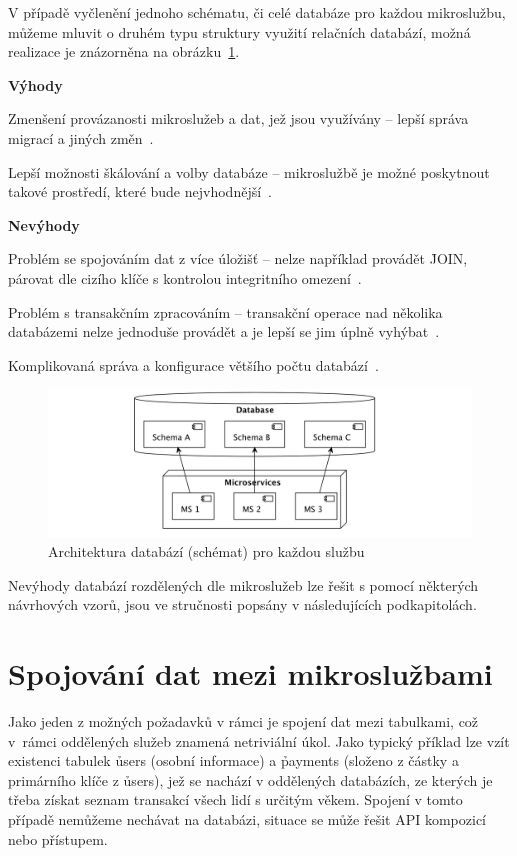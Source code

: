 V případě vyčlenění jednoho schématu, či celé databáze pro každou mikroslužbu, můžeme mluvit o druhém typu struktury využití relačních databází, možná realizace je znázorněna na obrázku~\ref{fig:db-per-micro}.


\textbf{Výhody}
\begin{ul}
   \item Zmenšení provázanosti mikroslužeb a dat, jež jsou využívány – lepší správa migrací a jiných změn~\cite{dbperservice}.
   \item Lepší možnosti škálování a volby databáze – mikroslužbě je možné poskytnout takové prostředí, které bude nejvhodnější~\cite{dbperservice}.
\end{ul}


\textbf{Nevýhody}
\begin{ul}
   \item Problém se spojováním dat z více úložišť – nelze například provádět \h{JOIN}, párovat dle cizího klíče s kontrolou integritního omezení~\cite{dbperservice}.
   \item Problém s transakčním zpracováním – transakční operace nad několika databázemi nelze jednoduše provádět a je lepší se jim úplně vyhýbat~\cite{dbperservice}.
   \item Komplikovaná správa a konfigurace většího počtu databází~\cite{dbperservice}.
\end{ul}


\begin{figure}[htbp]
   \centering
   \includegraphics[max width=\textwidth]{assets/db-per-micro}
   \caption{Architektura databází (schémat) pro každou službu}\label{fig:db-per-micro}
\end{figure}

Nevýhody databází rozdělených dle mikroslužeb lze řešit s pomocí některých návrhových vzorů, jsou ve stručnosti popsány v následujících podkapitolách.



\section{Spojování dat mezi mikroslužbami}\label{sec:msa-db-join}
Jako jeden z možných požadavků v rámci  je spojení dat mezi tabulkami, což v~rámci oddělených služeb znamená netriviální úkol.
Jako typický příklad lze vzít existenci tabulek \h{users} (osobní informace) a \h{payments} (složeno z částky a primárního klíče z \h{users}), jež se nachází v oddělených databázích, ze kterých je třeba získat seznam transakcí všech lidí s určitým věkem.
Spojení v tomto případě nemůžeme nechávat na databázi, situace se může řešit API kompozicí nebo  přístupem.



